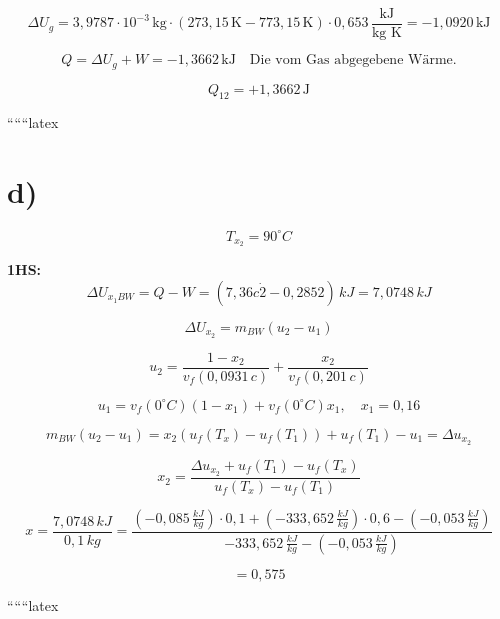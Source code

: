 \[
\Delta U_{g} = 3,9787 \cdot 10^{-3} \, \text{kg} \cdot (273,15 \, \text{K} - 773,15 \, \text{K}) \cdot 0,653 \, \frac{\text{kJ}}{\text{kg K}} = -1,0920 \, \text{kJ}
\]

\[
Q = \Delta U_{g} + W = -1,3662 \, \text{kJ} \quad \text{Die vom Gas abgegebene Wärme.}
\]

\[
Q_{12} = +1,3662 \, \text{J}
\]

``````latex

\section*{d)}

\[
T_{x_2} = 90^\circ C
\]

\textbf{1HS:}
\[
\Delta U_{x_1 BW} = Q - W = (7,36c\dot{2} - 0,2852) \, kJ = 7,0748 \, kJ
\]

\[
\Delta U_{x_2} = m_{BW} (u_2 - u_1)
\]

\[
u_2 = \frac{1 - x_2}{v_f (0,0931 \, c)} + \frac{x_2}{v_f (0,201 \, c)}
\]

\[
u_1 = v_f (0^\circ C) (1 - x_1) + v_f (0^\circ C) x_1, \quad x_1 = 0,16
\]

\[
m_{BW} (u_2 - u_1) = x_2 (u_f (T_x) - u_f (T_1)) + u_f (T_1) - u_1 = \Delta u_{x_2}
\]

\[
x_2 = \frac{\Delta u_{x_2} + u_f (T_1) - u_f (T_x)}{u_f (T_x) - u_f (T_1)}
\]

\[
x = \frac{7,0748 \, kJ}{0,1 \, kg} = \frac{(-0,085 \, \frac{kJ}{kg}) \cdot 0,1 + (-333,652 \, \frac{kJ}{kg}) \cdot 0,6 - (-0,053 \, \frac{kJ}{kg})}{-333,652 \, \frac{kJ}{kg} - (-0,053 \, \frac{kJ}{kg})}
\]

\[
= 0,575
\]

``````latex


